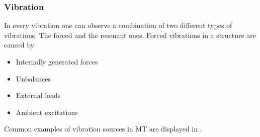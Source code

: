 \subsubsection{Vibration}

In every vibration one can observe a combination of two different types of vibrations. The forced and the resonant ones. Forced vibrations in a structure are caused by
\begin{itemize}
    \item Internally generated forces
    \item Unbalances
    \item External loads
    \item Ambient excitations
\end{itemize}
Common examples of vibration sources in \ac{MT} are displayed in .

